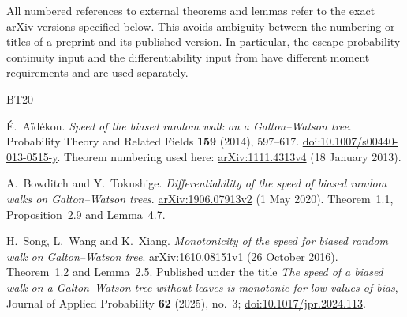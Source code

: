 \documentclass[11pt,a4paper]{article}
\numberwithin{equation}{section}
\theoremstyle{notethm}
\theoremstyle{definition}
\begin{document}
All numbered references to external theorems and lemmas refer to the exact
arXiv versions specified below. This avoids ambiguity between the numbering
or titles of a preprint and its published version. In particular, the
escape-probability continuity input and the differentiability input from
\cite{BT} have different moment requirements and are used separately.

\begingroup
\small
\begin{thebibliography}{BT20}
\setlength{\itemsep}{0.5em}

\'{E}.~A\"id\'ekon.
\emph{Speed of the biased random walk on a Galton--Watson tree}.
Probability Theory and Related Fields \textbf{159} (2014), 597--617.
\href{https://doi.org/10.1007/s00440-013-0515-y}{doi:10.1007/s00440-013-0515-y}.
Theorem numbering used here:
\href{https://arxiv.org/abs/1111.4313v4}{arXiv:1111.4313v4} (18 January 2013).

A.~Bowditch and Y.~Tokushige.
\emph{Differentiability of the speed of biased random walks on
Galton--Watson trees}.
\href{https://arxiv.org/abs/1906.07913v2}{arXiv:1906.07913v2}
(1 May 2020).
Theorem~1.1, Proposition~2.9 and Lemma~4.7.

H.~Song, L.~Wang and K.~Xiang.
\emph{Monotonicity of the speed for biased random walk on
Galton--Watson tree}.
\href{https://arxiv.org/abs/1610.08151v1}{arXiv:1610.08151v1}
(26 October 2016).
Theorem~1.2 and Lemma~2.5.
Published under the title \emph{The speed of a biased walk on a
Galton--Watson tree without leaves is monotonic for low values of bias},
Journal of Applied Probability \textbf{62} (2025), no.~3;
\href{https://doi.org/10.1017/jpr.2024.113}{doi:10.1017/jpr.2024.113}.

\end{thebibliography}
\endgroup
\end{document}
